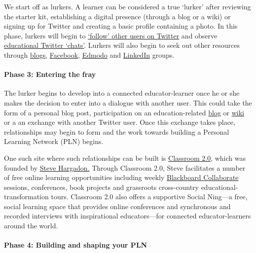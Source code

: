 We start off as lurkers. A learner can be considered a true `lurker'
after reviewing the starter kit, establishing a digital presence
(through a blog or a wiki) or signing up for Twitter and creating a
basic profile containing a photo. In this phase, lurkers will begin to
\href{http://www.fractuslearning.com/2012/05/25/twitter-follow-education-technology/}{`follow'
other users on Twitter} and observe
\href{http://cybraryman.com/chats.html}{educational
Twitter `chats'}. Lurkers will also begin to seek out other resources
through
\href{http://theinnovativeeducator.blogspot.ca/2012/04/ten-best-education-blogs.html}{blogs},
\href{http://www.edsocialmedia.com/2011/02/the-advantage-of-facebook-groups-in-education/}{Facebook},
\href{http://www.slideshare.net/cmsdsquires/edmodo-for-teachers-guide}{Edmodo}
and
\href{http://www.emergingedtech.com/2012/02/8-great-linkedin-groups-for-educators/}{LinkedIn}
groups.

\paragraph{Phase 3: Entering the fray}

The lurker begins to develop into a connected educator-learner once he
or she makes the decision to enter into a dialogue with another user.
This could take the form of a personal blog post, participation on an
education-related
\href{http://edudemic.com/2012/08/education-blogs/?utm\_medium=twitter\&utm\_source=twitterfeed}{blog}
or
\href{http://educationalwikis.wikispaces.com/Examples+of+educational+wikis}{wiki}
or a an exchange with another Twitter user. Once this exchange takes
place, relationships may begin to form and the work towards building a
Personal Learning Network (PLN) begins.

One such site where such relationships can be built is
\href{http://www.classroom20.com/}{Classroom 2.0}, which was founded by
\href{http://www.stevehargadon.com/}{Steve Hargadon.} Through Classroom
2.0, Steve facilitates a number of free online learning opportunities
including weekly
\href{http://www.futureofeducation.com/page/past-interviews}{Blackboard
Collaborate} sessions, conferences, book projects and grassroots
cross-country educational-transformation tours. Classroom 2.0 also
offers a supportive Social Ning---a free, social learning space that
provides online conferences and synchronous and recorded interviews with
inspirational educators---for connected educator-learners around the
world.

\paragraph{Phase 4: Building and shaping your PLN}

